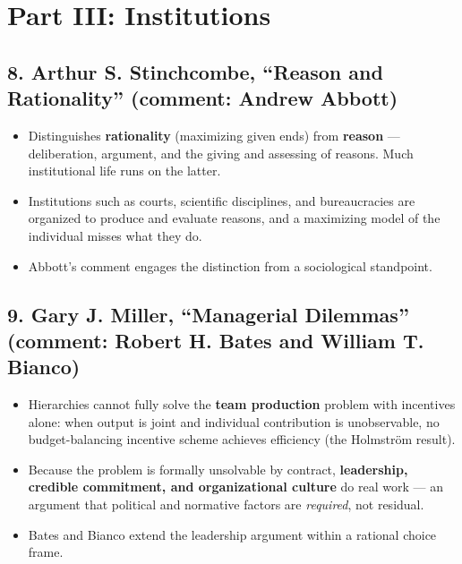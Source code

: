 \documentclass[12pt]{article}
\begin{document}
\section{Part III: Institutions}

\subsection*{8. Arthur S. Stinchcombe, ``Reason and Rationality'' (comment: Andrew Abbott)}
\begin{itemize}[leftmargin=*, itemsep=3pt]
    \item Distinguishes \textbf{rationality} (maximizing given ends) from
    \textbf{reason} --- deliberation, argument, and the giving and assessing of
    reasons. Much institutional life runs on the latter.
    \item Institutions such as courts, scientific disciplines, and
    bureaucracies are organized to produce and evaluate reasons, and a
    maximizing model of the individual misses what they do.
    \item Abbott's comment engages the distinction from a sociological
    standpoint.
\end{itemize}

\subsection*{9. Gary J. Miller, ``Managerial Dilemmas'' (comment: Robert H. Bates and William T. Bianco)}
\begin{itemize}[leftmargin=*, itemsep=3pt]
    \item Hierarchies cannot fully solve the \textbf{team production} problem
    with incentives alone: when output is joint and individual contribution is
    unobservable, no budget-balancing incentive scheme achieves efficiency
    (the Holmstr\"om result).
    \item Because the problem is formally unsolvable by contract,
    \textbf{leadership, credible commitment, and organizational culture} do
    real work --- an argument that political and normative factors are
    \emph{required}, not residual.
    \item Bates and Bianco extend the leadership argument within a rational
    choice frame.
\end{itemize}
\end{document}
